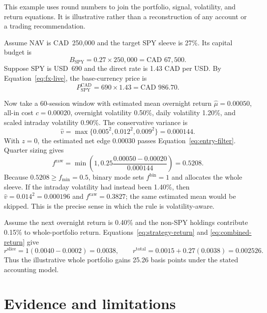 \documentclass[11pt]{article}
\begin{document}
This example uses round numbers to join the portfolio, signal, volatility, and return equations.
It is illustrative rather than a reconstruction of any account or a trading recommendation.

Assume NAV is CAD~250,000 and the target SPY sleeve is 27\%. Its capital budget is
\begin{equation}
 B_{\mathrm{SPY}}=0.27\times 250{,}000=\text{CAD }67{,}500.
 \label{eq:example-budget}
\end{equation}
Suppose SPY is USD~690 and the direct rate is 1.43 CAD per USD. By
Equation~\eqref{eq:fx-live}, the base-currency price is
\begin{equation}
 P_{\mathrm{SPY}}^{\mathrm{CAD}}=690\times1.43
 =\text{CAD }986.70.
 \label{eq:example-fx}
\end{equation}

Now take a 60-session window with estimated mean overnight return
$\widehat\mu=0.00050$, all-in cost $c=0.00020$, overnight volatility 0.50\%, daily volatility
1.20\%, and scaled intraday volatility 0.90\%. The conservative variance is
\begin{equation}
 \widehat v=\max\{0.005^2,0.012^2,0.009^2\}=0.000144.
 \label{eq:example-variance}
\end{equation}
With $z=0$, the estimated net edge $0.00030$ passes
Equation~\eqref{eq:entry-filter}. Quarter sizing gives
\begin{equation}
 f^{\mathrm{raw}}=\min\!\left(1,
 0.25\frac{0.00050-0.00020}{0.000144}\right)
 =0.5208.
 \label{eq:example-raw}
\end{equation}
Because $0.5208\geq f_{\min}=0.5$, binary mode sets $f^{\mathrm{bin}}=1$ and allocates the whole
sleeve. If the intraday volatility had instead been 1.40\%, then
$\widehat v=0.014^2=0.000196$ and $f^{\mathrm{raw}}=0.3827$; the same estimated mean would be
skipped. This is the precise sense in which the rule is volatility-aware.

Assume the next overnight return is 0.40\% and the non-SPY holdings contribute 0.15\% to
whole-portfolio return. Equations~\eqref{eq:strategy-return} and
\eqref{eq:combined-return} give
\begin{equation}
 r^{\mathrm{slice}}=1(0.0040-0.0002)=0.0038,
 \qquad
 r^{\mathrm{total}}=0.0015+0.27(0.0038)=0.002526.
 \label{eq:example-return}
\end{equation}
Thus the illustrative whole portfolio gains 25.26 basis points under the stated accounting model.

\section{Evidence and limitations}\label{sec:limitations}
\end{document}
